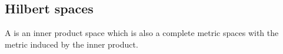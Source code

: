 \subsection{Hilbert spaces}\label{subsec:hilbert_spaces}

\begin{definition}\label{def:hilbert_space}
  A  is an inner product space which is also a complete metric spaces with the metric induced by the inner product.
\end{definition}
